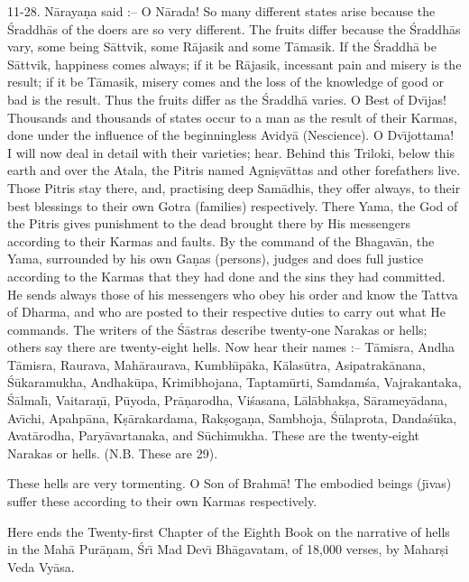 11-28. N\=araya\d{n}a said :-- O N\=arada! So many different states arise because the \'Sraddh\=as of the doers are so very different. The fruits differ because the \'Sraddh\=as vary, some being S\=attvik, some R\=ajasik and some T\=amasik. If the \'Sraddh\=a be S\=attvik, happiness comes always; if it be R\=ajasik, incessant pain and misery is the result; if it be T\=amasik, misery comes and the loss of the knowledge of good or bad is the result. Thus the fruits differ as the \'Sraddh\=a varies. O Best of Dv\={\i}jas! Thousands and thousands of states occur to a man as the result of their Karmas, done under the influence of the beginningless Avidy\=a (Nescience). O Dv\={\i}jottama! I will now deal in detail with their varieties; hear. Behind this Triloki, below this earth and over the Atala, the Pitris named Agni\d{s}v\=attas and other forefathers live. Those Pitris stay there, and, practising deep Sam\=adhis, they offer always, to their best blessings to their own Gotra (families) respectively. There Yama, the God of the Pitris gives punishment to the dead brought there by His messengers according to their Karmas and faults. By the command of the Bhagav\=an, the Yama, surrounded by his own Ga\d{n}as (persons), judges and does full justice according to the Karmas that they had done and the sins they had committed. He sends always those of his messengers who obey his order and know the Tattva of Dharma, and who are posted to their respective duties to carry out what He commands. The writers of the \'S\=astras describe twenty-one Narakas or hells; others say there are twenty-eight hells. Now hear their names :-- T\=amisra, Andha T\=amisra, Raurava, Mah\=araurava, Kumbh\={\i}p\=aka, K\=alas\=utra, Asipatrak\=anana, \'S\=ukaramukha, Andhak\=upa, Krimibhojana, Taptam\=urti, Samdam\'sa, Vajrakantaka, \'S\=almal\={\i}, Vaitara\d{n}\={\i}, P\=uyoda, Pr\=a\d{n}arodha, Vi\'sasana, L\=al\=abhak\d{s}a, S\=aramey\=adana, Av\={\i}chi, Apahp\=ana, K\d{s}\=arakardama, Rak\d{s}oga\d{n}a, Sambhoja, \'S\=ulaprota, Danda\'s\=uka, Avat\=arodha, Pary\=avartanaka, and S\=uchimukha. These are the twenty-eight Narakas or hells. (N.B. These are 29).

These hells are very tormenting. O Son of Brahm\=a! The embodied beings (j\={\i}vas) suffer these according to their own Karmas respectively.

Here ends the Twenty-first Chapter of the Eighth Book on the narrative of hells in the Mah\=a Pur\=a\d{n}am, \'Sr\={\i} Mad Dev\={\i} Bh\=agavatam, of 18,000 verses, by Mahar\d{s}i Veda Vy\=asa.



